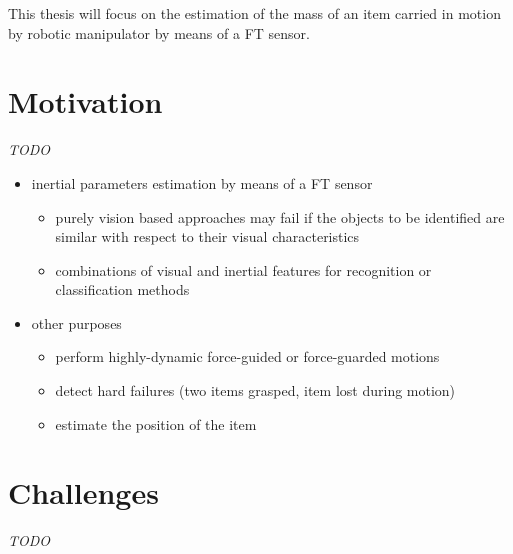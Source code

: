 \documentclass[/home/francois/latex/report/main.tex]{subfiles}
\begin{document}
This thesis will focus on the estimation of the mass of an item carried in motion by robotic manipulator by means of a \ac{FT} sensor.

\section{Motivation}

\textit{TODO}

{\it

\begin{itemize}
	\item inertial parameters estimation by means of a \ac{FT} sensor
	\begin{itemize}
		\item purely vision based approaches may fail if the objects to be identified are similar with respect to their visual characteristics
		\item combinations of visual and inertial features for recognition or classification methods
	\end{itemize}
	\item other purposes
	\begin{itemize}
		\item perform highly-dynamic force-guided or force-guarded motions \cite{Garcia2006, KubusKroger2008}
		\item detect hard failures (two items grasped, item lost during motion)
		\item estimate the position of the item
	\end{itemize}
\end{itemize}

}

\section{Challenges}

\textit{TODO}
\end{document}
